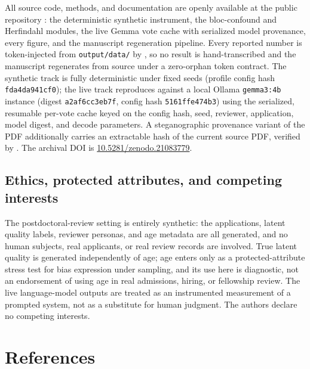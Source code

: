 \documentclass[
]{article}
\begin{document}
All source code, methods, and documentation are openly available at the
public repository
\href{https://github.com/docxology/ntqr_allotment}{}:
the deterministic synthetic instrument, the bloc-confound and Herfindahl
modules, the live Gemma vote cache with serialized model provenance,
every figure, and the manuscript regeneration pipeline. Every reported
number is token-injected from \texttt{output/data/} by
, so no result is
hand-transcribed and the manuscript regenerates from source under a
zero-orphan token contract. The synthetic track is fully deterministic
under fixed seeds (profile config hash \texttt{fda4da941cf0}); the live
track reproduces against a local Ollama \texttt{gemma3:4b} instance
(digest \texttt{a2af6cc3eb7f}, config hash \texttt{5161ffe474b3}) using
the serialized, resumable per-vote cache keyed on the config hash, seed,
reviewer, application, model digest, and decode parameters. A
steganographic provenance variant of the PDF additionally carries an
extractable hash of the current source PDF, verified by
. The archival DOI is
\href{https://doi.org/10.5281/zenodo.21083779}{10.5281/zenodo.21083779}.

\subsection{Ethics, protected attributes, and competing
interests}\label{ethics-protected-attributes-and-competing-interests}

The postdoctoral-review setting is entirely synthetic: the applications,
latent quality labels, reviewer personas, and age metadata are all
generated, and no human subjects, real applicants, or real review
records are involved. True latent quality is generated independently of
age; age enters only as a protected-attribute stress test for bias
expression under sampling, and its use here is diagnostic, not an
endorsement of using age in real admissions, hiring, or fellowship
review. The live language-model outputs are treated as an instrumented
measurement of a prompted system, not as a substitute for human
judgment. The authors declare no competing interests.

\newpage

\section{References}\label{references}
\end{document}
